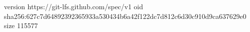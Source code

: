 version https://git-lfs.github.com/spec/v1
oid sha256:627c7d64892392365933a530434b6a42f122dc7d812c6d30c910d9ca637629e0
size 115577
